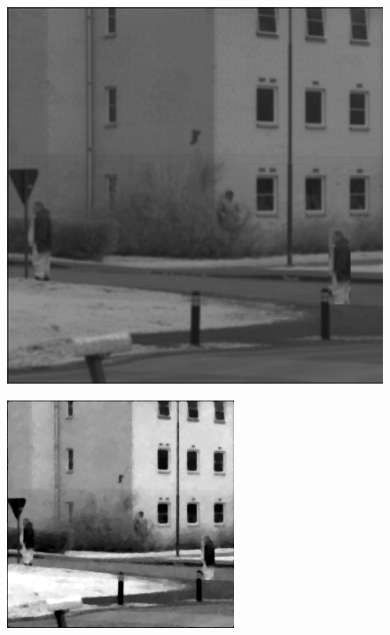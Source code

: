 \begin{figure}[H]
    \centering
\begin{minipage}[t]{0.32\textwidth}
    \includegraphics[width=1\textwidth]{result/dynamic/local/local_whole_time_org.png}
    \label{fig:local_1}
\end{minipage}
\begin{minipage}[t]{0.32\textwidth}
    \includegraphics[width = \textwidth]{result/dynamic/local/local_whole_time_ref.png}

\end{minipage}
\end{figure}

